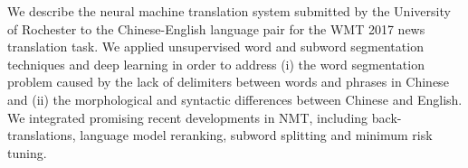 We describe the neural machine translation system submitted by the University of Rochester to the Chinese-English language pair for the WMT 2017 news translation task. We applied unsupervised word and subword segmentation techniques and deep learning in order to address (i) the word segmentation problem caused by the lack of delimiters between words and phrases in Chinese and (ii) the morphological and syntactic differences between Chinese and English. We integrated promising recent developments in NMT, including back-translations, language model reranking, subword splitting and minimum risk tuning.
